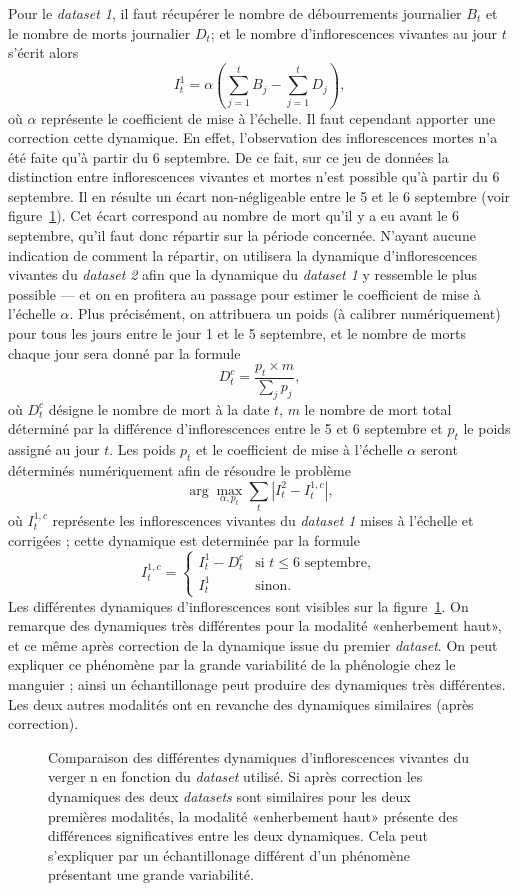 Pour le \emph{dataset 1}, il faut récupérer le nombre de débourrements journalier $B_t$ et le nombre de morts journalier $D_t$; et le nombre d'inflorescences vivantes au jour $t$ s'écrit alors
\[
I_t^1 = \alpha\left( \sum_{j=1}^{t} B_j - \sum_{j=1}^{t} D_j \right),
\]
où $\alpha$ représente le coefficient de mise à l'échelle.
Il faut cependant apporter une correction cette dynamique.
En effet, l'observation des inflorescences mortes n'a été faite qu'à partir du 6 septembre.
De ce fait, sur ce jeu de données la distinction entre inflorescences vivantes et mortes n'est possible qu'à partir du 6 septembre.
Il en résulte un écart non-négligeable entre le 5 et le 6 septembre (voir figure~\ref{fig:inflos}).
Cet écart correspond au nombre de mort qu'il y a eu avant le 6 septembre, qu'il faut donc répartir sur la période concernée.
N'ayant aucune indication de comment la répartir, on utilisera la dynamique d'inflorescences vivantes du \emph{dataset 2} afin que la dynamique du \emph{dataset 1} y ressemble le plus possible --- et on en profitera au passage pour estimer le coefficient de mise à l'échelle $\alpha$.
Plus précisément, on attribuera un poids (à calibrer numériquement) pour tous les jours entre le jour 1 et le 5 septembre, et le nombre de morts chaque jour sera donné par la formule
\[
D_{t}^{c} = \frac{p_t\times m}{\sum_{j}p_j},
\]
où $D_{t}^{c}$ désigne le nombre de mort à la date $t$, $m$ le nombre de mort total déterminé par la différence d'inflorescences entre le 5 et 6 septembre et $p_t$ le poids assigné au jour $t$. 
Les poids $p_t$ et le coefficient de mise à l'échelle $\alpha$ seront déterminés numériquement afin de résoudre le problème
\[
\arg\max_{\alpha, p_t} \sum_{t}\left|I^{2}_{t} - I_{t}^{1, c}\right|, 
\]
où $I_{t}^{1, c}$ représente les inflorescences vivantes du \emph{dataset 1} mises à l'échelle et corrigées ; cette dynamique est determinée par la formule
\[
I_{t}^{1, c} = \begin{cases}
                I_t^1 - D_t^{c} & \text{si } t \leq 6 \text{ septembre},\\
                I_t^1 & \text{sinon}.
               \end{cases}
\]
Les différentes dynamiques d'inflorescences sont visibles sur la figure~\ref{fig:inflos}.
On remarque des dynamiques très différentes pour la modalité «enherbement haut», et ce même après correction de la dynamique issue du premier \emph{dataset}.
On peut expliquer ce phénomène par la grande variabilité de la phénologie chez le manguier ; ainsi un échantillonage peut produire des dynamiques très différentes.
Les deux autres modalités ont en revanche des dynamiques similaires (après correction).
\begin{figure}[ht]
\centering
{}
\caption{Comparaison des différentes dynamiques d'inflorescences vivantes du verger n en fonction du \emph{dataset} utilisé. Si après correction les dynamiques des deux \emph{datasets} sont similaires pour les deux premières modalités, la modalité «enherbement haut» présente des différences significatives entre les deux dynamiques. Cela peut s'expliquer par un échantillonage différent d'un phénomène présentant une grande variabilité.}
\label{fig:inflos}
\end{figure}


